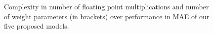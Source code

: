 

\begin{figure}[t]
  \centering
    \begin{adjustbox}{width=0.8\columnwidth}
      
    \end{adjustbox}
    \caption{Complexity in number of floating point multiplications and number of weight parameters (in brackets) over performance in MAE of our five proposed models.}%
  \label{fig:complexity}
 \end{figure}
